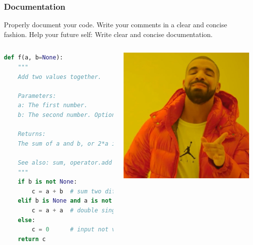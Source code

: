 \begin{frame}[fragile]
  \frametitle{Documentation}
    Properly document your code. Write your comments in a clear and concise fashion. Help your future self: Write clear and concise documentation.
    \begin{columns}
    \begin{lstlisting}[language=Python]
def f(a, b=None):
    """
    Add two values together.
    
    Parameters:
    a: The first number.
    b: The second number. Optional.
    
    Returns:
    The sum of a and b, or 2*a if b is not given, or 0 if a is not given.
    
    See also: sum, operator.add
    """
    if b is not None:
        c = a + b  # sum two different numbers
    elif b is None and a is not None:
        c = a + a  # double single number
    else:
        c = 0      # input not valid
    return c
    \end{lstlisting}
    \includegraphics[width=\columnwidth]{figures/drakeyes.jpg}
    \end{columns}
\end{frame}



